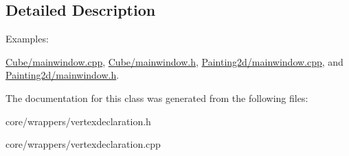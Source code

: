\subsection{Detailed Description}
\begin{Desc}
\item[Examples\+: ]\par
\hyperlink{_cube_2mainwindow_8cpp-example}{Cube/mainwindow.\+cpp}, \hyperlink{_cube_2mainwindow_8h-example}{Cube/mainwindow.\+h}, \hyperlink{_painting2d_2mainwindow_8cpp-example}{Painting2d/mainwindow.\+cpp}, and \hyperlink{_painting2d_2mainwindow_8h-example}{Painting2d/mainwindow.\+h}.\end{Desc}


The documentation for this class was generated from the following files\+:\begin{DoxyCompactItemize}
\item 
core/wrappers/vertexdeclaration.\+h\item 
core/wrappers/vertexdeclaration.\+cpp\end{DoxyCompactItemize}
